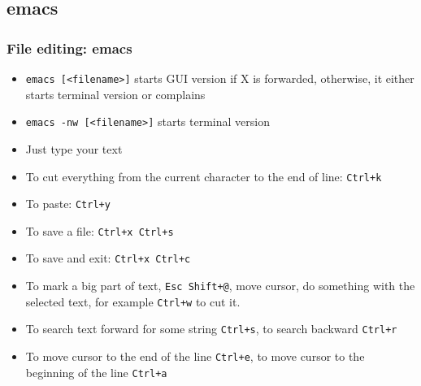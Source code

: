 \documentclass{beamer}
\begin{document}
\subsection{emacs}
\begin{frame}[fragile]
  \frametitle{File editing: emacs}
\begin{itemize}
\item {\color{mycolorcli}\verb|emacs [<filename>]|} starts GUI version if X is forwarded, otherwise, it either starts terminal version or complains
\item {\color{mycolorcli}\verb|emacs -nw [<filename>]|} starts terminal version
\item Just type your text
\item To cut everything from the current character to the end of line: {\color{mycolorcli}\verb|Ctrl+k|}
\item To paste: {\color{mycolorcli}\verb|Ctrl+y|}
\item To save a file: {\color{mycolorcli}\verb|Ctrl+x Ctrl+s|}
\item To save and exit: {\color{mycolorcli}\verb|Ctrl+x Ctrl+c|}
\item To mark a big part of text, {\color{mycolorcli}\verb|Esc Shift+@|}, move cursor, do something with the selected text, for example {\color{mycolorcli}\verb|Ctrl+w|} to cut it.
\item To search text forward for some string {\color{mycolorcli}\verb|Ctrl+s|}, to search backward {\color{mycolorcli}\verb|Ctrl+r|}
\item To move cursor to the end of the line {\color{mycolorcli}\verb|Ctrl+e|}, to move cursor to the beginning of the line {\color{mycolorcli}\verb|Ctrl+a|}
\end{itemize}
\end{frame}
\end{document}
